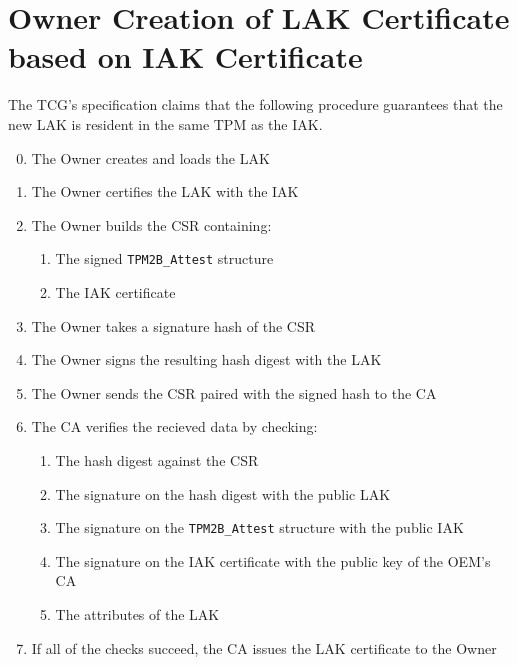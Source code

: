 \section{Owner Creation of LAK Certificate based on IAK Certificate}
The TCG's specification claims that the following procedure guarantees that the new LAK is resident in the same TPM as the IAK.
\begin{enumerate}[itemsep=0pt,parsep=0pt,partopsep=0pt]
  \setcounter{enumi}{-1}
  \item The Owner creates and loads the LAK
  \item The Owner certifies the LAK with the IAK
  \item The Owner builds the CSR containing:
  \begin{enumerate}[topsep=0pt, itemsep=0pt,parsep=0pt,partopsep=0pt]
    \item The signed \verb|TPM2B_Attest| structure
    \item The IAK certificate
  \end{enumerate}
  \item The Owner takes a signature hash of the CSR
  \item The Owner signs the resulting hash digest with the LAK
  \item The Owner sends the CSR paired with the signed hash to the CA
  \item The CA verifies the recieved data by checking:
  \begin{enumerate}[topsep=0pt, itemsep=0pt,parsep=0pt,partopsep=0pt]
    \item The hash digest against the CSR
    \item The signature on the hash digest with the public LAK
    \item The signature on the \verb|TPM2B_Attest| structure with the public IAK
    \item The signature on the IAK certificate with the public key of the OEM's CA
    \item The attributes of the LAK
  \end{enumerate}
  \item If all of the checks succeed, the CA issues the LAK certificate to the Owner
\end{enumerate}

